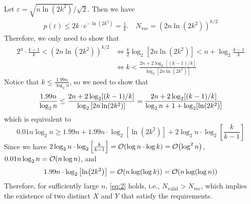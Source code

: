 \begin{answer}
    Let $\varepsilon = \sqrt{n\ln (2k^2)} / \sqrt{2}$. Then we have
    \begin{align*}
        p(\varepsilon) \le 2k \cdot e^{-\ln (2k^2)}  = \frac{1}{k}. \quad N_\text{vec} = \left(2n\ln (2k^2)\right)^{k/2}
    \end{align*}
    Therefore, we only need to show that
    \begin{align*}
        2^n \cdot \frac{k-1}{k} < \left(2n\ln (2k^2)\right)^{k/2} &\iff \frac{k}{2} \log_2 \left[2n \ln (2k^2)\right] < n + \log_2 \frac{k-1}{k}  \\
        &\iff k < \frac{2n + 2\log_2 [(k-1)/k]}{\log_2 \left[2n \ln (2k^2)\right]} 
    \end{align*}
    Notice that $ k \leq \frac{1.99n}{\log_2{n}}$, so we need to show that
    \begin{equation}
        \frac{1.99n}{\log_2{n}} \le  \frac{2n + 2\log_2 [(k-1)/k]}{\log_2 \left[2n \ln (2k^2)\right]} = \frac{2n + 2\log_2 [(k-1)/k]}{\log_2 n + 1 + \log_2 [\ln (2k^2)]} \\
    \end{equation}
    which is equivalent to
    \begin{equation}
        \label{eq:2}
        0.01 n\log_2 n \ge 1.99n + 1.99n \cdot \log_2 \left[\ln (2k^2)\right] + 2\log_2 n \cdot \log_2 \left[\frac{k}{k-1}\right]
    \end{equation}
    Since we have $2\log_2 n \cdot \log_2 \left[\frac{k}{k-1}\right] = \order{\log n \cdot \log k } = \order{\log^2 n}$,  $0.01 n\log_2 n = \order{n \log n}$, and 
    \begin{equation*}
        1.99n \cdot \log_2 \left[\ln (2k^2)\right] = \order{n \log(\log k)}  = \order{n \log(\log n)} 
    \end{equation*}
    Therefore, for sufficiently large $n$, \cref{eq:2} holds, i.e., $N_\text{valid} > N_\text{vec}$, which implies the existence of two distinct $X$ and $Y$ that satisfy the requirements.
    \ed
\end{answer}